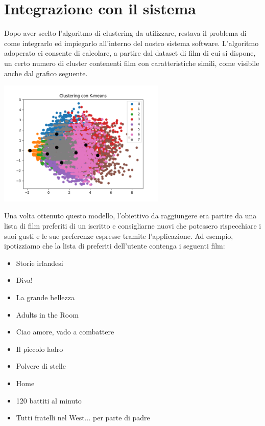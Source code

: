 \documentclass[a4paper, 10pt]{report}
\begin{document}
    \section{Integrazione con il sistema}\label{sec:integrazione-con-il-sistema}
            Dopo aver scelto l'algoritmo di clustering da utilizzare, restava il problema di come integrarlo ed impiegarlo all'interno
            del nostro sistema software.
            L'algoritmo adoperato ci consente di calcolare, a partire dal dataset di film di cui si dispone, un certo numero di cluster
            contenenti film con caratteristiche simili, come visibile anche dal grafico seguente.
            \begin{center}
                \includegraphics[width=8cm]{modelling/ClusterK-Means}\\
            \end{center}
            Una volta ottenuto questo modello, l'obiettivo da raggiungere era partire da una lista di film preferiti di un iscritto
            e consigliarne nuovi che potessero rispecchiare i suoi gusti e le sue preferenze espresse tramite l'applicazione.
            Ad esempio, ipotizziamo che la lista di preferiti dell'utente contenga i seguenti film:
            \begin{itemize}
                \item Storie irlandesi
                \item Diva!
                \item La grande bellezza
                \item Adults in the Room
                \item Ciao amore, vado a combattere
                \item Il piccolo ladro
                \item Polvere di stelle
                \item Home
                \item 120 battiti al minuto
                \item Tutti fratelli nel West... per parte di padre
            \end{itemize}
\end{document}
